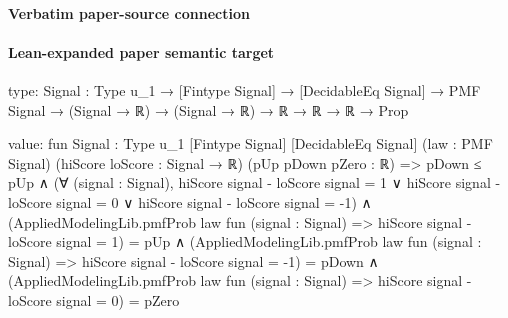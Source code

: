 \documentclass[10pt]{article}
\begin{document}
\paragraph{Verbatim paper-source connection}



\paragraph{Lean-expanded paper semantic target}
\begin{ReviewVerbatim}
type:
{Signal : Type u_1} →
  [Fintype Signal] → [DecidableEq Signal] → PMF Signal → (Signal → ℝ) → (Signal → ℝ) → ℝ → ℝ → ℝ → Prop

value:
fun {Signal : Type u_1} [Fintype Signal] [DecidableEq Signal] (law : PMF Signal) (hiScore loScore : Signal → ℝ)
    (pUp pDown pZero : ℝ) =>
  pDown ≤ pUp ∧
    (∀ (signal : Signal),
        hiScore signal - loScore signal = 1 ∨
          hiScore signal - loScore signal = 0 ∨ hiScore signal - loScore signal = -1) ∧
      (AppliedModelingLib.pmfProb law fun (signal : Signal) => hiScore signal - loScore signal = 1) = pUp ∧
        (AppliedModelingLib.pmfProb law fun (signal : Signal) => hiScore signal - loScore signal = -1) = pDown ∧
          (AppliedModelingLib.pmfProb law fun (signal : Signal) => hiScore signal - loScore signal = 0) = pZero
\end{ReviewVerbatim}
\end{document}
